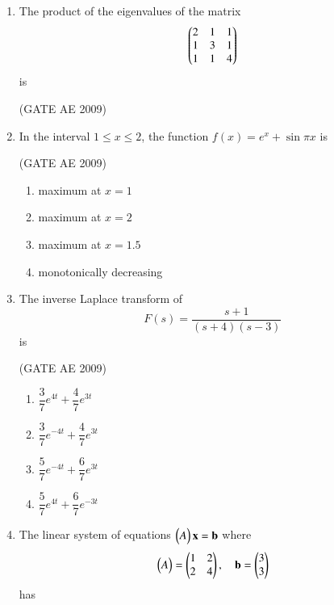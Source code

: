 \documentclass[journal,12pt,onecolumn]{IEEEtran}
\theoremstyle{remark}
\begin{document}
\begin{flushleft}
\begin{enumerate}
\begin{enumerate}
\end{enumerate}

\item The product of the eigenvalues of the matrix
\[
\begin{pmatrix}
2 & 1 & 1 \\
1 & 3 & 1 \\
1 & 1 & 4
\end{pmatrix}
\]
is

\hfill(GATE AE 2009)

\begin{enumerate}

\end{enumerate}

\item In the interval $1 \leq x \leq 2$, the function $f(x) = e^{x} + \sin \pi x$ is

\hfill(GATE AE 2009)

\begin{enumerate}
\item maximum at $x=1$
\item maximum at $x=2$
\item maximum at $x=1.5$
\item monotonically decreasing
\end{enumerate}

\item The inverse Laplace transform of
\[
F(s) = \frac{s+1}{(s+4)(s-3)}
\]
is

\hfill(GATE AE 2009)

\begin{enumerate}
\item $\dfrac{3}{7} e^{4t} + \dfrac{4}{7} e^{3t}$
\item $\dfrac{3}{7} e^{-4t} + \dfrac{4}{7} e^{3t}$
\item $\dfrac{5}{7} e^{-4t} + \dfrac{6}{7} e^{3t}$
\item $\dfrac{5}{7} e^{4t} + \dfrac{6}{7} e^{-3t}$
\end{enumerate}

\item The linear system of equations $\begin{pmatrix}A\end{pmatrix} \mathbf{x} = \mathbf{b}$ where
\[
\begin{pmatrix}A\end{pmatrix} = \begin{pmatrix}1 & 2 \\ 2 & 4\end{pmatrix}, \quad \mathbf{b} = \begin{pmatrix}3 \\ 3\end{pmatrix}
\]
has


\end{enumerate}
\end{flushleft}
\end{document}

